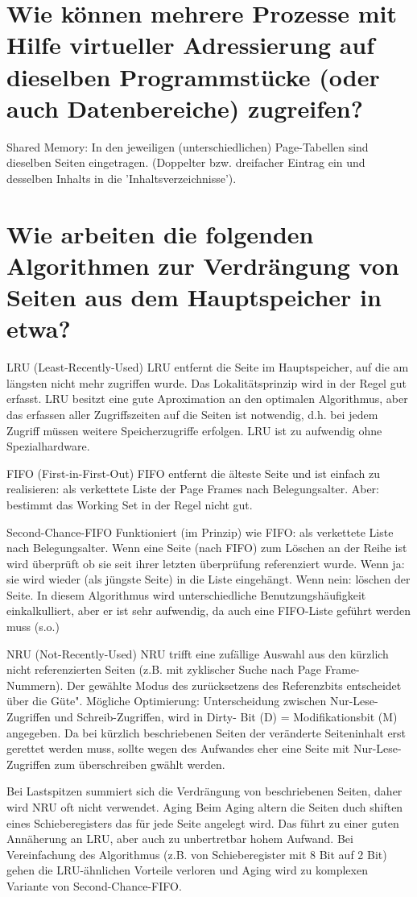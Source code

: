 \documentclass[12pt,a4paper,ngerman]{scrartcl}
\newcommand{\question}[1]{#1}
\newenvironment {answer}
                {}
                {}
\begin{document}
\section{\question{Wie können mehrere Prozesse mit Hilfe virtueller Adressierung auf dieselben Programmstücke (oder auch Datenbereiche) zugreifen?}}
\begin{answer}
Shared Memory:
In den jeweiligen (unterschiedlichen) Page-Tabellen sind dieselben Seiten eingetragen. (Doppelter
bzw. dreifacher Eintrag ein und desselben Inhalts in die 'Inhaltsverzeichnisse').
\end{answer}

\section{\question{Wie arbeiten die folgenden Algorithmen zur Verdrängung von Seiten aus dem Hauptspeicher in etwa?}}
\begin{answer}
LRU (Least-Recently-Used)
LRU entfernt die Seite im Hauptspeicher, auf die am längsten nicht mehr zugriffen
wurde. Das Lokalitätsprinzip wird in der Regel gut erfasst. LRU besitzt eine gute
Aproximation an den optimalen Algorithmus,
aber das erfassen aller Zugriffszeiten auf die Seiten ist notwendig, d.h. bei jedem
Zugriff müssen weitere Speicherzugriffe erfolgen. LRU ist zu aufwendig ohne Spezialhardware.

FIFO (First-in-First-Out)
FIFO entfernt die älteste Seite und ist einfach zu realisieren: als verkettete Liste der
Page Frames nach Belegungsalter.
Aber: bestimmt das Working Set in der Regel nicht gut.

Second-Chance-FIFO
Funktioniert (im Prinzip) wie FIFO: als verkettete Liste nach Belegungsalter. Wenn
eine Seite (nach FIFO) zum Löschen an der Reihe ist wird überprüft ob sie seit
ihrer letzten überprüfung referenziert wurde. Wenn ja: sie wird wieder (als jüngste
Seite) in die Liste eingehängt. Wenn nein: löschen der Seite.
In diesem Algorithmus wird unterschiedliche Benutzungshäufigkeit einkalkulliert,
aber er ist sehr aufwendig, da auch eine FIFO-Liste geführt werden muss (s.o.)

NRU (Not-Recently-Used)
NRU trifft eine zufällige Auswahl aus den kürzlich nicht referenzierten Seiten (z.B.
mit zyklischer Suche nach Page Frame-Nummern). Der gewählte Modus des zurücksetzens
des Referenzbits entscheidet über die Güte".
Mögliche Optimierung:
Unterscheidung zwischen Nur-Lese-Zugriffen und Schreib-Zugriffen, wird in Dirty-
Bit (D) = Modifikationsbit (M) angegeben.
Da bei kürzlich beschriebenen Seiten der veränderte Seiteninhalt erst gerettet werden
muss, sollte wegen des Aufwandes eher eine Seite mit Nur-Lese-Zugriffen zum
überschreiben gwählt werden.

Bei Lastspitzen summiert sich die Verdrängung von beschriebenen Seiten, daher
wird NRU oft nicht verwendet.
Aging
Beim Aging altern die Seiten duch shiften eines Schieberegisters das für jede Seite
angelegt wird. Das führt zu einer guten Annäherung an LRU, aber auch zu unbertretbar
hohem Aufwand. Bei Vereinfachung des Algorithmus (z.B. von Schieberegister
mit 8 Bit auf 2 Bit) gehen die LRU-ähnlichen Vorteile verloren und Aging wird
zu komplexen Variante von Second-Chance-FIFO.
\end{answer}
\end{document}
